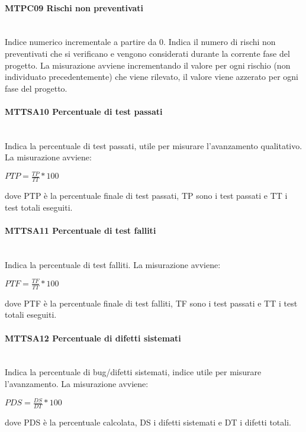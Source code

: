 \paragraph{MTPC09 Rischi non preventivati}\-\\
Indice numerico incrementale a partire da 0. Indica il numero di rischi non preventivati che si verificano e vengono considerati durante la corrente fase del progetto. La misurazione avviene incrementando il valore per ogni rischio (non individuato precedentemente) che viene rilevato, il valore viene azzerato per ogni fase del progetto.

\paragraph{MTTSA10 Percentuale di test passati}\-\\
Indica la percentuale di test passati, utile per misurare l'avanzamento qualitativo. La misurazione avviene:
\begin{center}
	\item $PTP = \frac{TP}{TT}*100$
\end{center}
dove PTP è la percentuale finale di test passati, TP sono i test passati e TT i test totali eseguiti.

\paragraph{MTTSA11 Percentuale di test falliti}\-\\
Indica la percentuale di test falliti. La misurazione avviene:
\begin{center}
	\item $PTF = \frac{TF}{TT}*100$
\end{center}
dove PTF è la percentuale finale di test falliti, TF sono i test passati e TT i test totali eseguiti.

\paragraph{MTTSA12 Percentuale di difetti sistemati}\-\\
Indica la percentuale di bug/difetti sistemati, indice utile per misurare l'avanzamento. La misurazione avviene:
\begin{center}
	\item $PDS = \frac{DS}{DT}*100$
\end{center}
dove PDS è la percentuale calcolata, DS i difetti sistemati e DT i difetti totali.

